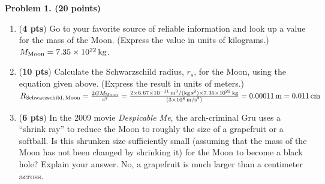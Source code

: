 \documentclass[12pt]{article}
\begin{document}
\newpage
\vspace{10pt}
\vspace{10pt}
\noindent \textbf{Problem 1. (20 points)} \begin{enumerate}
    \item[a)] (\textbf{4 pts}) Go to your favorite source of reliable information and look up a value for the mass of the Moon. (Express the value in units of kilograms.) \newline \newline $M_{\rm{Moon}}=7.35\times10^{22}\,\rm{kg}$. 
    
    \item[b)] (\textbf{10 pts}) Calculate the Schwarzschild radius, \( r_s \), for the Moon, using the equation given above. (Express the result in units of meters.) \newline \newline $R_{\rm{Schwarzschild,\,Moon}} = \frac{2GM_{\rm{Moon}}}{c^2} = \frac{2\times6.67\times10^{-11}\,\rm{m^3/(kg\,s^2)}\times7.35\times10^{22}\,\rm{kg}}{(3\times10^8\,\rm{m/s}^2)} =0.00011\,\rm{m} = 0.011\,\rm{cm}$
    
    \item[c)] (\textbf{6 pts}) In the 2009 movie \textit{Despicable Me}, the arch-criminal Gru uses a “shrink ray” to reduce the Moon to roughly the size of a grapefruit or a softball. Is this shrunken size sufficiently small (assuming that the mass of the Moon has not been changed by shrinking it) for the Moon to become a black hole? Explain your answer. \newline \newline No, a grapefruit is much larger than a centimeter across. 
\end{enumerate}
\end{document}
